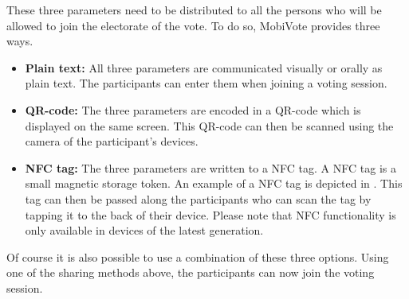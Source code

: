 \documentclass[numbers=noenddot, abstract=on, a4paper, headsepline,
footsepline, oneside, openright, draft=off, listof=leveldown]{scrreprt}
\begin{document}
These three parameters need to be distributed to all the persons who will be
allowed to join the electorate of the vote. To do so, MobiVote provides three
ways.
\begin{itemize}
  \item \textbf{Plain text:} All three parameters are communicated visually or
  orally as plain text. The participants can enter them when joining a voting
  session.
  \item \textbf{QR-code:} The three parameters are encoded in a QR-code which is
  displayed on the same screen. This QR-code can then be scanned using the
  camera of the participant's devices.
  \item \textbf{NFC tag:} The three parameters are written to a NFC tag. A NFC
  tag is a small magnetic storage token. An example of a NFC tag is depicted in
  . This tag can then be passed along the participants
  who can scan the tag by tapping it to the back of their device. Please note
  that NFC functionality is only available in devices of the latest generation.
\end{itemize}
Of course it is also possible to use a combination of these three options. Using
one of the sharing methods above, the participants can now join the voting
session.
\end{document}
